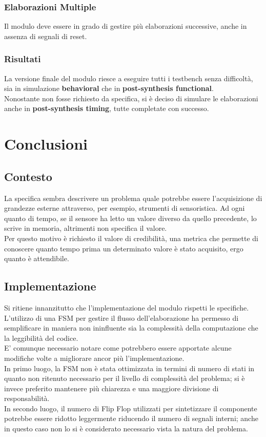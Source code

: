 \documentclass{article}
\begin{document}
\subsubsection{Elaborazioni Multiple}
Il modulo deve essere in grado di gestire più elaborazioni successive, anche in assenza di segnali di reset. 

\subsubsection{Risultati}
La versione finale del modulo riesce a eseguire tutti i testbench senza difficoltà, sia in simulazione \textbf{behavioral} che in \textbf{post-synthesis functional}.
\medskip \\ Nonostante non fosse richiesto da specifica, si è deciso di simulare le elaborazioni anche in \textbf{post-synthesis timing}, tutte completate con successo. 




\newpage
\section{Conclusioni}
\subsection{Contesto}
La specifica sembra descrivere un problema quale potrebbe essere l'acquisizione di grandezze esterne attraverso, per esempio, strumenti di sensoristica. Ad ogni quanto di tempo, se il sensore ha letto un valore diverso da quello precedente, lo scrive in memoria, altrimenti non specifica il valore.
\medskip \\ Per questo motivo è richiesto il valore di credibilità, una metrica che permette di conoscere quanto tempo prima un determinato valore è stato acquisito, ergo quanto è attendibile.
\subsection{Implementazione}
Si ritiene innanzitutto che l'implementazione del modulo rispetti le specifiche.
\medskip \\ L'utilizzo di una FSM per gestire il flusso dell'elaborazione ha permesso di semplificare in maniera non ininfluente sia la complessità della computazione che la leggibilità del codice. 
\medskip \\ E' comunque necessario notare come potrebbero essere apportate alcune modifiche volte a migliorare ancor più l'implementazione.
\medskip \\ In primo luogo, la FSM non è stata ottimizzata in termini di numero di stati in quanto non ritenuto necessario per il livello di complessità del problema; si è invece preferito mantenere più chia\-rezza e una maggiore divisione di responsabilità.
\medskip \\ In secondo luogo, il numero di Flip Flop utilizzati per sintetizzare il componente potrebbe essere ridotto leggermente riducendo il numero di segnali interni; anche in questo caso non lo si è considerato necessario vista la natura del problema.
\end{document}
